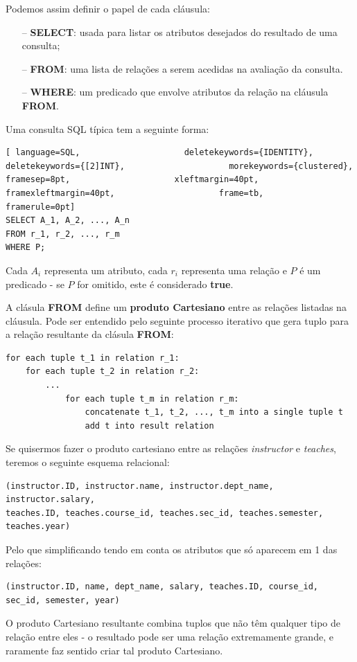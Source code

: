 \documentclass[titlepage]{book}
\theoremstyle{definition}
\begin{document}
Podemos assim definir o papel de cada cláusula:
\begin{itemize}
    \itemsep0cm
    \item[--]\textbf{SELECT}: usada para listar os atributos desejados do resultado de uma consulta;
    \item[--]\textbf{FROM}: uma lista de relações a serem acedidas na avaliação da consulta.
    \item[--]\textbf{WHERE}: um predicado que envolve atributos da relação na cláusula \textbf{FROM}.
\end{itemize}

Uma consulta SQL típica tem a seguinte forma:
\begin{lstlisting}[ language=SQL,                     deletekeywords={IDENTITY},                     deletekeywords={[2]INT},                     morekeywords={clustered},                     framesep=8pt,                     xleftmargin=40pt,                     framexleftmargin=40pt,                     frame=tb,                     framerule=0pt]
SELECT A_1, A_2, ..., A_n
FROM r_1, r_2, ..., r_m
WHERE P;
\end{lstlisting}
Cada $A_i$ representa um atributo, cada $r_i$ representa uma relação e $P$ é um predicado - se $P$ for omitido, este é considerado \textbf{true}.

A clásula \textbf{FROM} define um \textbf{produto Cartesiano} entre as relações listadas na cláusula. Pode ser entendido pelo seguinte processo iterativo que gera tuplo para a relação resultante da clásula \textbf{FROM}:
\begin{verbatim}
for each tuple t_1 in relation r_1:
    for each tuple t_2 in relation r_2:
        ...
            for each tuple t_m in relation r_m:
                concatenate t_1, t_2, ..., t_m into a single tuple t
                add t into result relation   
\end{verbatim}

Se quisermos fazer o produto cartesiano entre as relações \textit{instructor} e \textit{teaches}, teremos o seguinte esquema relacional:
\begin{verbatim}
(instructor.ID, instructor.name, instructor.dept_name, instructor.salary,
teaches.ID, teaches.course_id, teaches.sec_id, teaches.semester, teaches.year)
\end{verbatim}
Pelo que simplificando tendo em conta os atributos que só aparecem em 1 das relações:
\begin{verbatim}
(instructor.ID, name, dept_name, salary, teaches.ID, course_id, sec_id, semester, year)
\end{verbatim}
O produto Cartesiano resultante combina tuplos que não têm qualquer tipo de relação entre eles - o resultado pode ser uma relação extremamente grande, e raramente faz sentido criar tal produto Cartesiano.
\end{document}
